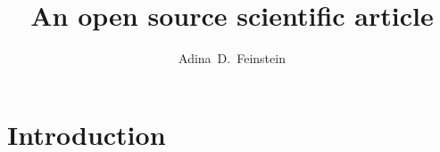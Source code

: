 \documentclass[twocolumn]{aastex631}
\begin{document}
\title{An open source scientific article}

\author{Adina~D.~Feinstein}

\begin{abstract}
    \blindtext
\end{abstract}

\section{Introduction}
\Blindtext[4]
\end{document}

